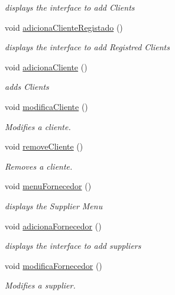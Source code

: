 \begin{DoxyCompactItemize}
\begin{DoxyCompactList}\small\item\em displays the interface to add Clients \end{DoxyCompactList}\item 
void \hyperlink{classEmpresa_a430c00a63ef70338de3b4b7c096ea194}{adiciona\+Cliente\+Registado} ()
\begin{DoxyCompactList}\small\item\em displays the interface to add Registred Clients \end{DoxyCompactList}\item 
void \hyperlink{classEmpresa_aba4af6a945948ac66e771a416cfc2a2a}{adiciona\+Cliente} ()
\begin{DoxyCompactList}\small\item\em adds Clients \end{DoxyCompactList}\item 
void \hyperlink{classEmpresa_a9b938f2436e95e68afce6cc04f2100bc}{modifica\+Cliente} ()
\begin{DoxyCompactList}\small\item\em Modifies a cliente. \end{DoxyCompactList}\item 
void \hyperlink{classEmpresa_ab9af9446d6d2c206b4b3e18e1bcb6475}{remove\+Cliente} ()
\begin{DoxyCompactList}\small\item\em Removes a cliente. \end{DoxyCompactList}\item 
void \hyperlink{classEmpresa_adb9d8d4aa55f253fc534e220ca4a87ac}{menu\+Fornecedor} ()
\begin{DoxyCompactList}\small\item\em displays the Supplier Menu \end{DoxyCompactList}\item 
void \hyperlink{classEmpresa_af20261a3f95a5dd0c4a5a796d9a3d442}{adiciona\+Fornecedor} ()
\begin{DoxyCompactList}\small\item\em displays the interface to add suppliers \end{DoxyCompactList}\item 
void \hyperlink{classEmpresa_aa0470e1fd4f41615a230fc8048b8b321}{modifica\+Fornecedor} ()
\begin{DoxyCompactList}\small\item\em Modifies a supplier. \end{DoxyCompactList}\item 

\end{DoxyCompactItemize}
